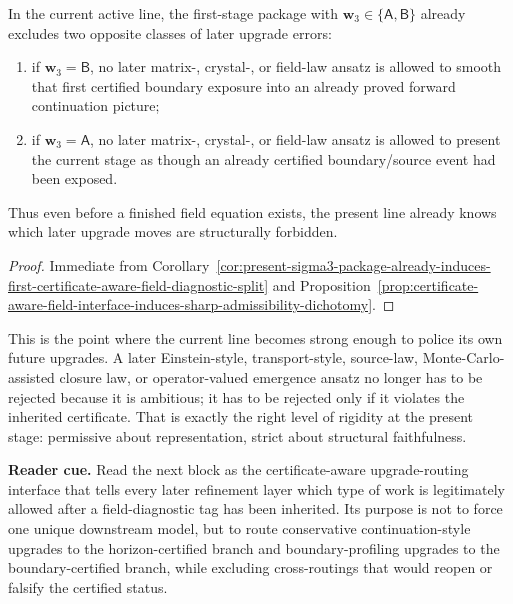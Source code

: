 \begin{corollary}
\label{cor:present-sigma3-package-already-excludes-wrong-kinds-of-field-law-upgrades}
In the current active line, the first-stage package with \(\mathbf w_3\in\{\mathsf A,\mathsf B\}\) already excludes two opposite classes of later upgrade errors:
\begin{enumerate}[label=(\roman*)]
 \item if \(\mathbf w_3=\mathsf B\), no later matrix-, crystal-, or field-law ansatz is allowed to smooth that first certified boundary exposure into an already proved forward continuation picture;
 \item if \(\mathbf w_3=\mathsf A\), no later matrix-, crystal-, or field-law ansatz is allowed to present the current stage as though an already certified boundary/source event had been exposed.
\end{enumerate}
Thus even before a finished field equation exists, the present line already knows which later upgrade moves are structurally forbidden.
\end{corollary}

\begin{proof}
Immediate from Corollary~\ref{cor:present-sigma3-package-already-induces-first-certificate-aware-field-diagnostic-split} and Proposition~\ref{prop:certificate-aware-field-interface-induces-sharp-admissibility-dichotomy}.
\end{proof}

\begin{remark}
\label{rem:what-this-admissibility-gate-now-buys}
This is the point where the current line becomes strong enough to police its own future upgrades. A later Einstein-style, transport-style, source-law, Monte-Carlo-assisted closure law, or operator-valued emergence ansatz no longer has to be rejected because it is ambitious; it has to be rejected only if it violates the inherited certificate. That is exactly the right level of rigidity at the present stage: permissive about representation, strict about structural faithfulness.
\end{remark}

\noindent\textbf{Reader cue.} Read the next block as the certificate-aware upgrade-routing interface that tells every later refinement layer which type of work is legitimately allowed after a field-diagnostic tag has been inherited. Its purpose is not to force one unique downstream model, but to route conservative continuation-style upgrades to the horizon-certified branch and boundary-profiling upgrades to the boundary-certified branch, while excluding cross-routings that would reopen or falsify the certified status.

